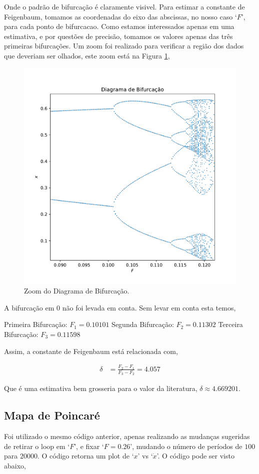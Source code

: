 \documentclass[twoside]{amsart}
\numberwithin{equation}{section}
\begin{document}
Onde o padrão de bifurcação é claramente visivel. Para estimar a constante de Feigenbaum, tomamos as coordenadas do 
eixo das abscissas, no nosso caso `$F$', para cada ponto de bifurcacao. Como estamos interessados apenas em uma estimativa, 
e por questões de precisão, tomamos os valores apenas das três primeiras bifurcações. Um zoom foi realizado para verificar 
a região dos dados que deveriam ser olhados, este zoom está na Figura \ref{zoom},

\begin{figure}[h]
    \includegraphics[width=0.5\linewidth]{bifzoom.pdf}
    \caption{Zoom do Diagrama de Bifurcação.}
    \label{zoom}
\end{figure}

A bifurcação em $0$ não foi levada em conta. Sem levar em conta esta temos,

Primeira Bifurcação: $F_1=0.10101$
Segunda Bifurcação: $F_2=0.11302$
Terceira Bifurcação: $F_3=0.11598$

Assim, a constante de Feigenbaum está relacionada com, 

\begin{align}
    \delta&=\frac{F_2-F_1}{F_3-F_2}=4.057\nonumber
\end{align}

Que é uma estimativa bem grosseria para o valor da literatura, $\delta \approx4.669201$.

\subsection{Mapa de Poincaré}

Foi utilizado o mesmo código anterior, apenas realizando as mudanças sugeridas de 
retirar o loop em `$F$', e fixar `$F=0.26$', mudando o número de períodos de $100$ para 
$20000$. O código retorna um plot de `$x$' vs `$\dot x$'. O código pode ser visto abaixo,
\end{document}
